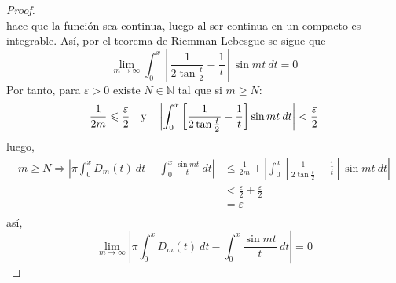 \documentclass[12pt]{report}
\newcounter{it}
\theoremstyle{largebreak}
\renewcommand{\leq}{\ensuremath{\leqslant}}
\renewcommand{\geq}{\ensuremath{\geqslant}}
\newcommand\abs[1]{\ensuremath{\left|#1\right|}}
\begin{document}
\begin{proof}
\begin{equation*}
        \end{equation*}
        hace que la función sea continua, luego al ser continua en un compacto es integrable. Así, por el teorema de Riemman-Lebesgue se sigue que
        \begin{equation*}
            \lim_{ m\rightarrow\infty}\int_{0}^{x}\left[\frac{1}{2\tan\frac{t}{2}}-\frac{1}{t}\right]\sin mt\:dt=0
        \end{equation*}
        Por tanto, para $\varepsilon>0$ existe $N\in\mathbb{N}$ tal que si $m\geq N$:
        \begin{equation*}
            \frac{1}{2m}\leq\frac{\varepsilon}{2}\quad\textup{y}\quad\abs{\int_{0}^{x}\left[\frac{1}{2\tan\frac{t}{2}}-\frac{1}{t}\right]\sin mt\:dt}<\frac{\varepsilon}{2}
        \end{equation*}
        luego,
        \begin{equation*}
            \begin{split}
                m\geq N\Rightarrow\abs{\pi\int_0^x D_m(t)\:dt-\int_{0}^{x}\frac{\sin mt}{t}\:dt}&\leq\frac{1}{2m}+\abs{\int_{0}^{x}\left[\frac{1}{2\tan\frac{t}{2}}-\frac{1}{t}\right]\sin mt\:dt}\\
                &<\frac{\varepsilon}{2}+\frac{\varepsilon}{2}\\
                &=\varepsilon\\
            \end{split}
        \end{equation*}
        así,
        \begin{equation*}
            \lim_{ m\rightarrow\infty}\abs{\pi\int_0^x D_m(t)\:dt-\int_{0}^{x}\frac{\sin mt}{t}\:dt}=0
        \end{equation*}


\end{proof}
\end{document}
